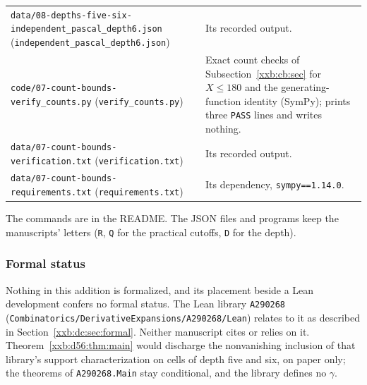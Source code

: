 \documentclass[11pt,a4paper]{article}
\numberwithin{equation}{section}
\theoremstyle{definition}
\theoremstyle{remark}
\theoremstyle{plain}
\begin{document}
\begin{longtable}{@{}>{\raggedright\arraybackslash}p{}>{\raggedright\arraybackslash}p{}@{}}
\texttt{data/08-depths-\allowbreak five-\allowbreak six-\allowbreak independent\_pascal\_depth6.json} (\texttt{independent\_\allowbreak pascal\_\allowbreak depth6.json}) & Its recorded output.\\
\texttt{code/07-count-\allowbreak bounds-\allowbreak verify\_counts.py} (\texttt{verify\_\allowbreak counts.py}) & Exact count checks of Subsection~\ref{xxb:cb:sec} for $X\le180$ and the generating-function identity (SymPy); prints three \texttt{PASS} lines and writes nothing.\\
\texttt{data/07-count-\allowbreak bounds-\allowbreak verification.txt} (\texttt{verification.txt}) & Its recorded output.\\
\texttt{data/07-count-\allowbreak bounds-\allowbreak requirements.txt} (\texttt{requirements.txt}) & Its dependency, \texttt{sympy==1.14.0}.\\
\bottomrule
\end{longtable}
\endgroup
\addtocounter{table}{-1}
The commands are in the README.  The JSON files and programs keep the
manuscripts' letters (\texttt{R}, \texttt{Q} for the practical cutoffs,
\texttt{D} for the depth).

\subsubsection{Formal status}\label{xxb:d56:sec:formal}

Nothing in this addition is formalized, and its placement beside a Lean
development confers no formal status.  The Lean library \texttt{A290268}
(\texttt{Combinatorics/\allowbreak DerivativeExpansions/\allowbreak A290268/\allowbreak Lean})
relates to it as described in Section~\ref{xxb:dc:sec:formal}.  Neither
manuscript cites or relies on it.  Theorem~\ref{xxb:d56:thm:main} would
discharge the nonvanishing inclusion of that library's support
characterization on cells of depth five and six, on paper only; the theorems
of \texttt{A290268.Main} stay conditional, and the library defines no
$\gamma$.

\end{document}
